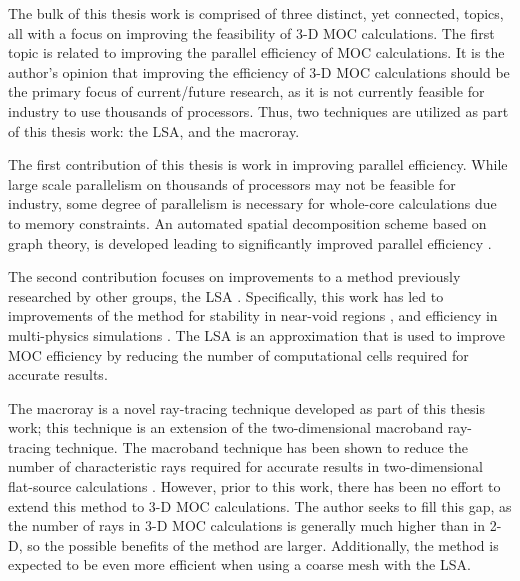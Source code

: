 {{        The bulk of this thesis work is comprised of three distinct, yet connected, topics, all with a focus on improving the feasibility of 3-D \ac{MOC} calculations.
        The first topic is related to improving the parallel efficiency of \ac{MOC} calculations.
        It is the author's opinion that improving the efficiency of 3-D \ac{MOC} calculations should be the primary focus of current/future research, as it is not currently feasible for industry to use thousands of processors.
        Thus, two techniques are utilized as part of this thesis work: the \acf{LSA}, and the macroray.

        The first contribution of this thesis is work in improving parallel efficiency.
        While large scale parallelism on thousands of processors may not be feasible for industry, some degree of parallelism is necessary for whole-core calculations due to memory constraints.
        An automated spatial decomposition scheme based on graph theory, is developed leading to significantly improved parallel efficiency \cite{Fitzgerald2017,Fitzgerald2019a}.

        The second contribution focuses on improvements to a method previously researched by other groups, the \acf{LSA} \cite{Ferrer2016,Ferrer2018,Gunow2018}.
        Specifically, this work has led to improvements of the method for stability in near-void regions \cite{Fitzgerald2018}, and efficiency in multi-physics simulations \cite{Fitzgerald2019}.
        The \ac{LSA} is an approximation that is used to improve \ac{MOC} efficiency by reducing the number of computational cells required for accurate results.

        The macroray is a novel ray-tracing technique developed as part of this thesis work; this technique is an extension of the two-dimensional macroband \cite{Villarino1992} ray-tracing technique.
        The macroband technique has been shown to reduce the number of characteristic rays required for accurate results in two-dimensional flat-source calculations \cite{Yamamoto2005,Fevotte2007}.
        However, prior to this work, there has been no effort to extend this method to 3-D \ac{MOC} calculations.
        The author seeks to fill this gap, as the number of rays in 3-D \ac{MOC} calculations is generally much higher than in 2-D, so the possible benefits of the method are larger.
        Additionally, the method is expected to be even more efficient when using a coarse mesh with the \ac{LSA}.
    }
}
